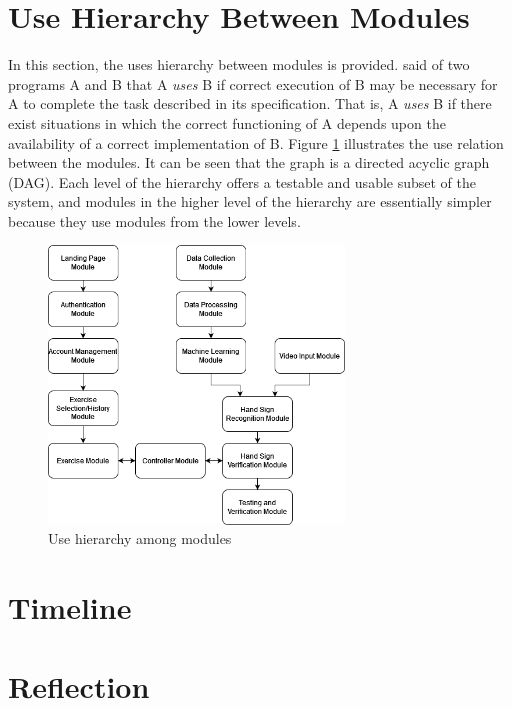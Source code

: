 \documentclass[12pt, titlepage]{article}
\begin{document}
\section{Use Hierarchy Between Modules} \label{SecUse}

In this section, the uses hierarchy between modules is
provided. \citet{Parnas1978} said of two programs A and B that A {\em uses} B if
correct execution of B may be necessary for A to complete the task described in
its specification. That is, A {\em uses} B if there exist situations in which
the correct functioning of A depends upon the availability of a correct
implementation of B.  Figure \ref{FigUH} illustrates the use relation between
the modules. It can be seen that the graph is a directed acyclic graph
(DAG). Each level of the hierarchy offers a testable and usable subset of the
system, and modules in the higher level of the hierarchy are essentially simpler
because they use modules from the lower levels.

\begin{figure}[H]
\centering
\includegraphics[width=0.7\textwidth]{UsesHierarchy.png}
\caption{Use hierarchy among modules}
\label{FigUH}
\end{figure}

\section{Timeline}


\section{Reflection}
\end{document}

